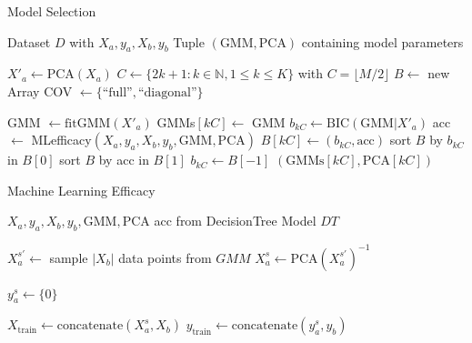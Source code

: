  \begin{algorithm}
    \caption{Model Selection}
    \label{alg:model_selection}
 
    \begin{algorithmic}[1]
        \REQUIRE Dataset $D$ with $X_a, y_a, X_b, y_b$
        \ENSURE Tuple $(\text{GMM}, \text{PCA})$ containing model parameters

        \STATE $X'_a \leftarrow \text{PCA}(X_a)$
        \STATE $C \leftarrow \{2k+1: k \in \mathbb{N}, 1 \leq k \leq K\}$ with $C=\lfloor M / 2 \rfloor$
        \STATE $B \leftarrow$ new Array
        \STATE COV $\leftarrow \{ \text{``full''}, \text{``diagonal''} \}$

                \STATE GMM $\leftarrow \text{fitGMM}(X'_a)$
                \STATE GMMs$[kC] \leftarrow$ GMM
                \STATE $b_{kC} \leftarrow \text{BIC}(\text{GMM}|X'_a)$
                \STATE acc $\leftarrow$ MLefficacy$(X_a, y_a, X_b, y_b, \text{GMM}, \text{PCA})$
                \STATE $B[kC] \leftarrow (b_{kC}, \text{acc})$
            \ENDFOR
        \ENDFOR
        \STATE sort $B$ by $b_{kC}$ in $B[0]$
        \STATE sort $B$ by acc in $B[1]$
        \STATE $b_{kC} \leftarrow B[-1]$
        \RETURN $(\text{GMMs}[kC], \text{PCA}[kC])$
    \end{algorithmic}
 \end{algorithm}


 \begin{algorithm}
    \caption{Machine Learning Efficacy}
    \label{alg:ml_efficacy}
 
    \begin{algorithmic}[1]
        \REQUIRE $X_a, y_a, X_b, y_b, \text{GMM}, \text{PCA}$
        \ENSURE acc from DecisionTree Model $DT$

        \STATE $X^{s'}_a \leftarrow$ sample $|X_b|$ data points from $GMM$
        \STATE $X^s_a \leftarrow \text{PCA}(X^{s'}_a)^{-1}$  

        \STATE $y^s_a \leftarrow \{ 0 \}$ 
        
        \STATE $X_{\text{train}} \leftarrow \text{concatenate}(X^s_a, X_b)$
        \STATE $y_{\text{train}} \leftarrow \text{concatenate}(y^s_a, y_b)$
    \end{algorithmic}
 \end{algorithm}
%
